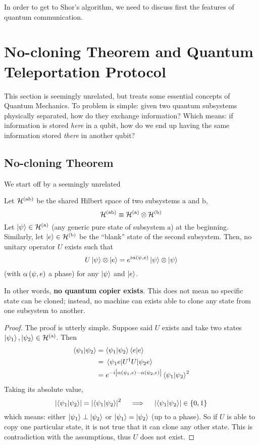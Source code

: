 In order to get to Shor's algorithm, we need to discuss first the features of quantum communication.

\section{No-cloning Theorem and Quantum Teleportation Protocol}

This section is seemingly unrelated, but treats some essential concepts of Quantum Mechanics. To problem is simple: given two quantum subsystems physically separated, how do they exchange information? Which means: if information is stored \textit{here} in a qubit, how do we end up having the same information stored \textit{there} in another qubit?

\subsection{No-cloning Theorem}

We start off by a seemingly unrelated
\begin{theorem}[No-cloning]
	Let $\mathcal{H}^{(\mathrm{ab})}$ be the shared Hilbert space of two subsystems $\mathrm{a}$ and $\mathrm{b}$,
	\[
		\mathcal{H}^{(\mathrm{ab})} \equiv \mathcal{H}^{(\mathrm{a})} \otimes \mathcal{H}^{(\mathrm{b})}
	\]
	Let $\ket{\psi} \in \mathcal{H}^{(\mathrm{a})}$ (any generic pure state of subsystem $\mathrm{a}$) at the beginning. Similarly, let $\ket{e} \in \mathcal{H}^{(\mathrm{b})}$ be the ``blank'' state of the second subsystem. Then, no unitary operator $U$ exists such that
	\[
		U \ket{\psi} \otimes \ket{e} = e^{i \alpha\left({\psi,e}\right)} \ket{\psi} \otimes \ket{\psi}
	\]
	(with $\alpha\left({\psi,e}\right)$ a phase) for any $\ket{\psi}$ and $\ket{e}$.
\end{theorem}
In other words, \textbf{no quantum copier exists}. This does not mean no specific state can be cloned; instead, no machine can exists able to clone any state from one subsystem to another.

\begin{proof}
	The proof is utterly simple. Suppose said $U$ exists and take two states $\ket{\psi_1}, \ket{\psi_2} \in \mathcal{H}^{(\mathrm{a})}$. Then
	\[
	\begin{aligned}
		\braket{\psi_1}{\psi_2} &= \braket{\psi_1}{\psi_2} \braket{e}{e} \\
		&= \mel{\psi_1 e}{U^\dag U}{\psi_2 e} \\
		&= e^{-i \left[{\vphantom{A^A} \alpha\left({\psi_1,e}\right)-\alpha\left({\psi_2,e}\right) }\right]} \braket{\psi_1}{\psi_2}^2
	\end{aligned}
	\]
	Taking its absolute value,
	\[
		\abs{\braket{\psi_1}{\psi_2}} = \abs{\braket{\psi_1}{\psi_2}}^2
		\quad\implies\quad
		\abs{\braket{\psi_1}{\psi_2}} \in \lbrace 0,1 \rbrace
	\]
	which means: either $\ket{\psi_1} \perp \ket{\psi_2}$ or $\ket{\psi_1} = \ket{\psi_2}$ (up to a phase). So if $U$ is able to copy one particular state, it is not true that it can clone any other state. This is contradiction with the assumptions, thus $U$ does not exist.
\end{proof}

